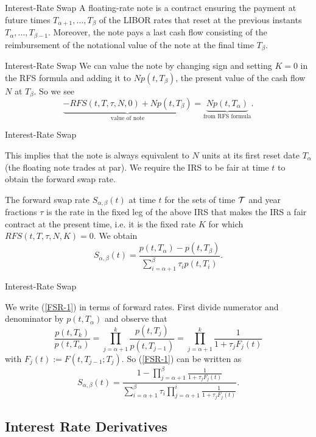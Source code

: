 {Interest-Rate Swap}
A floating-rate note is a
contract ensuring the payment at future times
$T_{\alpha+1},\ldots,T_{\beta}$ of the LIBOR rates that reset at the previous instants
$T_{\alpha},\ldots,T_{\beta-1}$. Moreover, the note pays a last
cash flow consisting of the reimbursement of the notational value
of the note at the final time $T_{\beta}$.

{Interest-Rate Swap}
We can value the note by changing sign and setting $K=0$ in the
RFS formula and adding it to $Np(t,T_{\beta})$, the present value
of the cash flow $N$ at $T_{\beta}$. So we see
$$
\underbrace{-RFS(t,T,\tau,N,0)+Np(t,T_{\beta})}_{\mbox{value of note}}=
\underbrace{Np(t,T_{\alpha})}_{\mbox{from RFS formula}}.
$$

{Interest-Rate Swap}

This implies that the note is always equivalent to $N$ units at
its first reset date $T_{\alpha}$ (the floating note trades at
par). We require the IRS to be fair at time $t$ to obtain the
forward swap rate.

The forward swap rate $S_{\alpha,\beta}(t)$ at time $t$ for the
sets of time $\cal T$ and year fractions $\tau$ is the rate in the
fixed leg of the above IRS that makes the IRS a fair contract at
the present time, i.e. it is the fixed rate $K$ for which
$RFS(t,T,\tau,N,K)=0$. We obtain
\begin{equation}\label{FSR-1}
S_{\alpha,\beta}(t)=\frac{p(t,T_{\alpha})-p(t,T_{\beta})}{\sum_{i=\alpha+1}^{\beta}\tau_ip(t,T_i)}.
\end{equation}

{Interest-Rate Swap}

We write (\ref{FSR-1}) in terms of forward rates. First divide numerator
and denominator by $p(t,T_{\alpha})$ and observe that
$$
\frac{p(t,T_k)}{p(t,T_{\alpha})}=
\prod_{j=\alpha+1}^k\frac{p(t,T_j)}{p(t,T_{j-1})}=
\prod_{j=\alpha+1}^k\frac{1}{1+\tau_jF_j(t)}$$
with $F_j(t):=F(t,T_{j-1};T_j)$. So (\ref{FSR-1}) can be written as
\begin{equation}
S_{\alpha,\beta}(t)=
\frac{1-\prod_{j=\alpha+1}^{\beta}\frac{1}{1+\tau_jF_j(t)}}
{\sum_{i=\alpha+1}^{\beta}\tau_i\prod_{j=\alpha+1}^{i}\frac{1}{1+\tau_jF_j(t)}}.
\end{equation}

\subsection{Interest Rate Derivatives}

